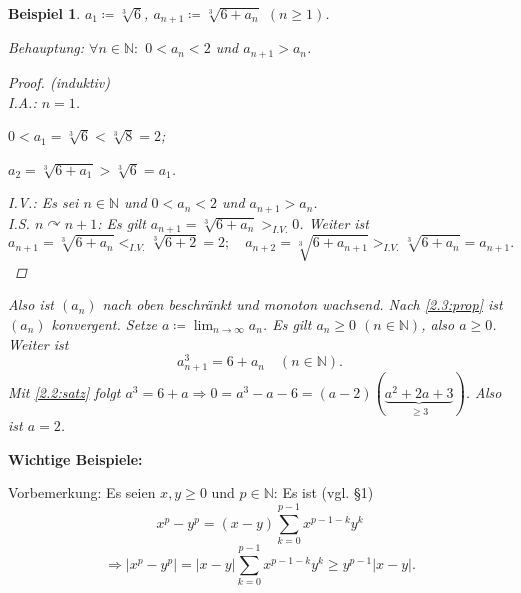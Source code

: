 \documentclass[12pt]{extreport} %
\newcommand{\N}{\mathbb{N}}
\theoremstyle{named}
\theoremstyle{itshape}
\theoremstyle{normal}
\newtheorem*{beispiel*}{Beispiel}
\begin{document}
\begin{beispiel*} $a_{1} \coloneqq \sqrt[3]{6}$, $a_{n + 1} \coloneqq \sqrt[3]{6 + a_{n}}$ $(n \geq 1)$.
	
	Behauptung: $\forall n \in \N:$ $0 < a_{n} < 2$ und $a_{n + 1} > a_{n}$.

	\begin{proof}(induktiv) \\
		I.A.: $n=1$. 
		\begin{description}
		\item $0 < a_{1} = \sqrt[3]{6} < \sqrt[3]{8} = 2$;
		\item $a_{2} = \sqrt[3]{6 + a_{1}} > \sqrt[3]{6} = a_{1}$.
	\end{description}
		
		I.V.: Es sei $n \in \N$ und $0 < a_{n} < 2$ und $a_{n+1} > a_{n}$. \\
		I.S. $n \curvearrowright n + 1$: Es gilt $a_{n + 1} = \sqrt[3]{6 + a_{n}} >_{I.V.} 0$. Weiter ist
		$$
			a_{n +1} = \sqrt[3]{6 + a_{n}} <_{I.V.} \sqrt[3]{6 + 2} = 2; \quad a_{n + 2} = \sqrt[3]{6 + a_{n+1}} >_{I.V.} \sqrt[3]{6 + a_{n}} = a_{n + 1}.
		$$
	\end{proof}
		Also ist  $(a_{n})$ nach oben beschränkt und monoton wachsend. Nach {\ref{2.3:prop}} ist $(a_{n})$ konvergent. 
		Setze $a \coloneqq \lim_{n \to \infty} a_{n}$. Es gilt $a_{n} \geq 0$ $(n \in \N)$, also $a \geq 0$. Weiter ist
		$$
			a_{n+1}^{3} = 6 + a_{n} \quad (n \in \N).
		$$
		Mit {\ref{2.2:satz}} folgt $a^{3} = 6 + a \Rightarrow 0 = a^{3} - a - 6 = (a-2)(\underbrace{a^{2}+2a+3}_{\geq 3})$. Also ist $a = 2$.
\end{beispiel*}


\textbf{Wichtige Beispiele:} 


Vorbemerkung: Es seien $x, y \geq 0$ und $p \in \N$: Es ist (vgl. \S 1)
	$$ x^{p} - y^{p} = (x - y) \sum_{k = 0}^{p-1} x^{p-1-k}y^{k} $$
$$ \Rightarrow |x^{p} - y^{p}| = |x-y| \sum_{k=0}^{p-1} x^{p-1-k}y^{k} \geq y^{p-1} |x - y|.$$
\end{document}
